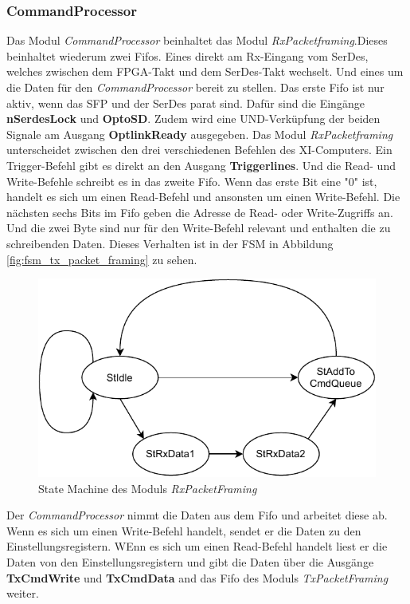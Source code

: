\documentclass{article}
\begin{document}
\subsubsection*{CommandProcessor}
Das Modul \textit{CommandProcessor} beinhaltet das Modul \textit{RxPacketframing}.Dieses beinhaltet wiederum zwei Fifos. Eines direkt am Rx-Eingang vom SerDes, welches zwischen dem FPGA-Takt und dem SerDes-Takt wechselt. Und eines um die Daten für den \textit{CommandProcessor} bereit zu stellen. Das erste Fifo ist nur aktiv, wenn das SFP und der SerDes parat sind. Dafür sind die Eingänge \textbf{nSerdesLock} und \textbf{OptoSD}. Zudem wird eine UND-Verküpfung der beiden Signale am Ausgang \textbf{OptlinkReady} ausgegeben. Das Modul \textit{RxPacketframing} unterscheidet zwischen den drei verschiedenen Befehlen des XI-Computers. Ein Trigger-Befehl gibt es direkt an den Ausgang \textbf{Triggerlines}. Und die Read- und Write-Befehle schreibt es in das zweite Fifo. Wenn das erste Bit eine "0" ist, handelt es sich um einen Read-Befehl und ansonsten um einen Write-Befehl. Die nächsten sechs Bits im Fifo geben die Adresse de Read- oder Write-Zugriffs an. Und die zwei Byte sind nur für den Write-Befehl relevant und enthalten die zu schreibenden Daten. Dieses Verhalten ist in der FSM in Abbildung \ref{fig:fsm_tx_packet_framing} zu sehen.

\begin{figure}[tb]
    \includegraphics[width=\linewidth]{drawio/fsm_rx_packet_framing}
    \caption{State Machine des Moduls \textit{RxPacketFraming}}
    \label{fig:fsm_rx_packet_framing}
\end{figure}

Der \textit{CommandProcessor} nimmt die Daten aus dem Fifo und arbeitet diese ab. Wenn es sich um einen Write-Befehl handelt, sendet er die Daten zu den Einstellungsregistern. WEnn es sich um einen Read-Befehl handelt liest er die Daten von den Einstellungsregistern und gibt die Daten über die Ausgänge \textbf{TxCmdWrite} und \textbf{TxCmdData} and das Fifo des Moduls \textit{TxPacketFraming} weiter.
\end{document}
